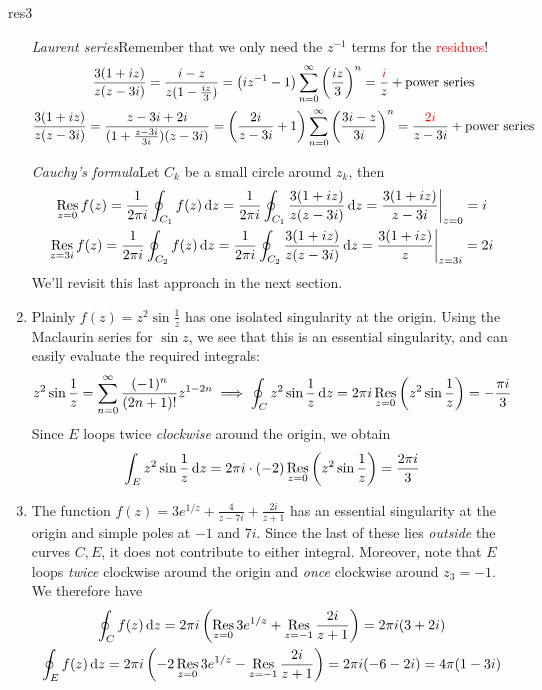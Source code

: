 \begin{examples}{}{res3}
\begin{enumerate}
\emph{Laurent series}\quad Remember that we only need the $z^{-1}$ terms for the \textcolor{red}{residues}!
\begin{gather*}
  \frac{3(1+iz)}{z(z-3i)}=\frac{i-z}{z(1-\frac{iz}3)}=\left(iz^{-1}-1\right)\sum_{n=0}^\infty\left(\frac{iz}3\right)^n =\frac{\textcolor{red}{i}}z+\text{power series}\\
  \frac{3(1+iz)}{z(z-3i)}=\frac{z-3i+2i}{(1+\frac{z-3i}{3i})(z-3i)}=\left(\frac{2i}{z-3i}+1\right)\sum_{n=0}^\infty\left(\frac{3i-z}{3i}\right)^n =\frac{\textcolor{red}{2i}}{z-3i}+\text{power series}
  \end{gather*}
  
\emph{Cauchy's formula}\quad Let $C_k$ be a small circle around $z_k$, then
  \begin{gather*}
  \operatorname*{Res}_{z=0}f(z)=\frac 1{2\pi i}\oint_{C_1}f(z)\,{\mathrm{d} z} =\frac 1{2\pi i}\oint_{C_1}\frac{3(1+iz)}{z(z-3i)}\,{\mathrm{d} z} = \frac{3(1+iz)}{z-3i}\bigg|_{z=0}=i\\
  \operatorname*{Res}_{z=3i}f(z)=\frac 1{2\pi i}\oint_{C_2}f(z)\,{\mathrm{d} z} =\frac 1{2\pi i}\oint_{C_2}\frac{3(1+iz)}{z(z-3i)}\,{\mathrm{d} z} = \frac{3(1+iz)}{z}\bigg|_{z=3i}=2i
  \end{gather*}
  We'll revisit this last approach in the next section.
  \goodbreak
  
  \item Plainly $f(z)=z^2\sin\frac 1z$ has one isolated singularity at the origin. Using the Maclaurin series for $\sin z$, we see that this is an essential singularity, and can easily evaluate the required integrals:
  \[z^2\sin\frac 1z=\sum_{n=0}^\infty \frac{(-1)^n}{(2n+1)!}z^{1-2n} \implies \oint_Cz^2\sin\frac 1z\,{\mathrm{d} z}=2\pi i\operatorname*{Res}_{z=0}\left(z^2\sin\frac 1z\right) =-\frac{\pi i}3\]
  Since $E$ loops twice \emph{clockwise} around the origin, we obtain
  \[\int_Ez^2\sin\frac 1z\,{\mathrm{d} z}=2\pi i\cdot (-2)\operatorname*{Res}_{z=0}\left(z^2\sin\frac 1z\right) =\frac{2\pi i}3\]  

	\item The function $f(z)=3e^{1/z}+\frac 4{z-7i}+\frac{2i}{z+1}$ has an essential singularity at the origin and simple poles at $-1$ and $7i$. Since the last of these lies \emph{outside} the curves $C,E$, it does not contribute to either integral. Moreover, note that $E$ loops \emph{twice} clockwise around the origin and \emph{once} clockwise around $z_3=-1$. We therefore have
  \begin{gather*}
  \oint_Cf(z)\,{\mathrm{d} z}=2\pi i\left(\operatorname*{Res}_{z=0}3e^{1/z}+\operatorname*{Res}_{z=-1} \frac{2i}{z+1}\right)=2\pi i(3+2i)\\
  \oint_Ef(z)\,{\mathrm{d} z}=2\pi i\left(-2\operatorname*{Res}_{z=0}3e^{1/z}-\operatorname*{Res}_{z=-1} \frac{2i}{z+1}\right)=2\pi i(-6-2i)=4\pi(1-3i)
  \end{gather*}
\end{enumerate}
\end{examples}

